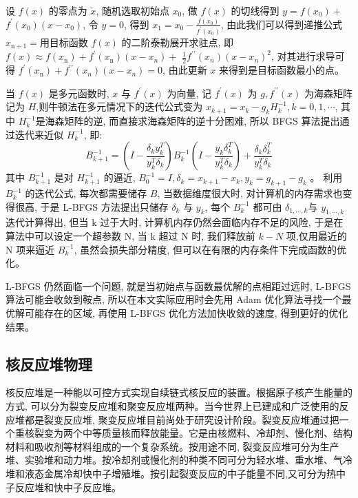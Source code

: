 \documentclass{Sichuan Normal University}
\begin{document}
设 $f(x)$ 的零点为 $\tilde{x}$, 随机选取初始点 $x_0$, 做 $f(x)$ 的切线得到 $y=f\left(x_0\right)+$ $f^{\prime}\left(x_0\right)\left(x-x_0\right)$, 令 $y=0$, 得到 $x_1=x_0-\frac{f\left(x_0\right)}{f^{\prime}\left(x_0\right)}$, 
由此我们可以得到递推公式 $x_{\mathrm{n}+1}=$用目标函数 $f(x)$ 的二阶泰勒展开求驻点, 即 $f(x) \approx f\left(x_{\mathrm{n}}\right)+f^{\prime}\left(x_{\mathrm{n}}\right)\left(x-x_n\right)+$ $\frac{1}{2} f^{\prime \prime}\left(x_n\right)\left(x-x_n\right)^2$, 
对其进行求导可得 $f^{\prime}\left(x_{\mathrm{n}}\right)+f^{\prime \prime}\left(x_n\right)\left(x-x_n\right)=0$, 由此更新 $x$ 来得到是目标函数最小的点。

当 $f(x)$ 是多元函数时, $x$ 与 $f^{\prime}(x)$ 为向量, 记 $f^{\prime}(x)$ 为 $g, f^{\prime \prime}(x)$ 为海森矩阵记为 $H$,则牛顿法在多元情况下的迭代公式变为 $x_{k+1}=x_k-g_k H_k^{-1}, k=0,1, \cdots$, 其中 $H_k^{-1}$是海森矩阵的逆, 
而直接求海森矩阵的逆十分困难, 所以 BFGS 算法提出通过迭代来近似 $H_k^{-1}$, 即:
\begin{equation}
    B_{k+1}^{-1}=\left(I-\frac{\delta_k y_k^T}{y_k^T \delta_k}\right) B_k^{-1}\left(I-\frac{y_k \delta_k^T}{y_k^T \delta_k}\right)+\frac{\delta_k \delta_k^T}{y_k^T \delta_k}
\label{eq:BFGS}
\end{equation}
其中 $B_{k+1}^{-1}$ 是对 $H_{k+1}^{-1}$ 的逼近, $B_0^{-1}=I, \delta_k=x_{k+1}-x_k, y_k=g_{k+1}-g_k$ 。
利用 $B_k^{-1}$ 的迭代公式, 每次都需要储存 $B$, 当数据维度很大时, 对计算机的内存需求也变得很高, 于是 L-BFGS 方法提出只储存 $\delta_k$ 与 $y_k$, 每个 $B_k^{-1}$ 都可由 $\delta_{1, \cdots, k}$与 $y_{1, \cdots, k}$ 迭代计算得出, 但当 $\mathrm{k}$ 过于大时, 计算机内存仍然会面临内存不足的风险, 于是在算法中可以设定一个超参数 $\mathrm{N}$, 当 $\mathrm{k}$ 超过 $\mathrm{N}$ 时, 我们释放前 $k-N$ 项,仅用最近的 $\mathrm{N}$ 项来逼近 $B_k^{-1}$, 虽然会损失部分精度, 但可以在有限的内存条件下完成函数的优化。

L-BFGS 仍然面临一个问题, 就是当初始点与函数最优解的点相距过远时, L-BFGS 算法可能会收敛到鞍点, 所以在本文实际应用时会先用 Adam 优化算法寻找一个最优解可能存在的区域, 再使用 L-BFGS 优化方法加快收敛的速度, 得到更好的优化结果。

\subsection{核反应堆物理}
核反应堆是一种能以可控方式实现自续链式核反应的装置。根据原子核产生能量的方式, 可以分为裂变反应堆和聚变反应堆两种\cite{XieZhongShengHeFanYingDuiWuLiFenXi2020}。当今世界上已建成和广泛使用的反应堆都是裂变反应堆, 聚变反应堆目前尚处于研究设计阶段。裂变反应堆通过把一个重核裂变为两个中等质量核而释放能量。它是由核燃料、冷却剂、慢化剂、结构材料和吸收剂等材料组成的一个复杂系统。按用途不同, 裂变反应堆可分为生产堆、实验堆和动力堆。按冷却剂或慢化剂的种类不同可分为轻水堆、重水堆、气冷堆和液态金属冷却快中子增殖堆。按引起裂变反应的中子能量不同,又可分为热中子反应堆和快中子反应堆。
\end{document}
